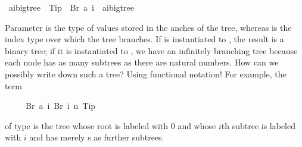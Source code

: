 %
\begin{isabellebody}%
\def\isabellecontext{Fundata}%
\isamarkupfalse%
\ {\isacharparenleft}{\isacharprime}a{\isacharcomma}{\isacharprime}i{\isacharparenright}bigtree\ {\isacharequal}\ Tip\ {\isacharbar}\ Br\ {\isacharprime}a\ {\isachardoublequote}{\isacharprime}i\ {\isasymRightarrow}\ {\isacharparenleft}{\isacharprime}a{\isacharcomma}{\isacharprime}i{\isacharparenright}bigtree{\isachardoublequote}\isamarkupfalse%
%
\begin{isamarkuptext}%
\noindent
Parameter  is the type of values stored in
the anches of the tree, whereas  is the index
type over which the tree branches. If  is instantiated to
, the result is a binary tree; if it is instantiated to
, we have an infinitely branching tree because each node
has as many subtrees as there are natural numbers. How can we possibly
write down such a tree? Using functional notation! For example, the term
\begin{isabelle}%
\ \ \ \ \ Br\ {\isacharparenleft}{}{\isasymColon}{\isacharprime}a{\isacharparenright}\ {\isacharparenleft}{\isasymlambda}i{\isachardot}\ Br\ i\ {\isacharparenleft}{\isasymlambda}n{\isachardot}\ Tip{\isacharparenright}{\isacharparenright}%
\end{isabelle}
of type  is the tree whose
root is labeled with 0 and whose $i$th subtree is labeled with $i$ and
has merely s as further subtrees.


\end{isamarkuptext}
\end{isabellebody}
